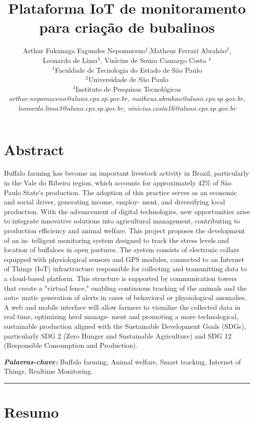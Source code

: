 \documentclass[11pt,a4paper]{article}
\title{\vspace{0.6cm}\textbf{\Large Plataforma IoT de monitoramento para criação de bubalinos}}
\author{
    Arthur Fukunaga Fagundes Nepomuceno$^{1}$,Matheus Ferrari Abrahão$^{2}$,\\Leonardo de Lima$^{3}$, Vinícius de Souza Camargo Costa $^{4}$ \\[0.3cm]
    \small
    $^{1}$Faculdade de Tecnologia do Estado de São Paulo \\
    $^{2}$Universidade de São Paulo \\
    $^{3}$Instituto de Pesquisas Tecnológicas \\[0.2cm]
    {\itshape arthur.nepomuceno@aluno.cps.sp.gov.br, matheus.abrahao@aluno.cps.sp.gov.br,}\\ {\itshape leonardo.lima3@aluno.cps.sp.gov.br, vinicius.costa16@aluno.cps.sp.gov.br}
}
\date{}
\begin{document}
\pagestyle{fancy}

\maketitle
\thispagestyle{fancy}

\section*{Abstract}

 Buffalo farming has become an important livestock activity in Brazil, particularly in the Vale do Ribeira region, which accounts for approximately 42\% of São Paulo State's production. The adoption of this practice serves as an economic and social driver, generating income, employ- ment, and diversifying local production. With the advancement of digital technologies, new opportunities arise to integrate innovative solutions into agricultural management, contributing to production efficiency and animal welfare. This project proposes the development of an in- telligent monitoring system designed to track the stress levels and location of buffaloes in open pastures. The system consists of electronic collars equipped with physiological sensors and GPS modules, connected to an Internet of Things (IoT) infrastructure responsible for collecting and transmitting data to a cloud-based platform. This structure is supported by communication towers that create a "virtual fence," enabling continuous tracking of the animals and the auto- matic generation of alerts in cases of behavioral or physiological anomalies. A web and mobile interface will allow farmers to visualize the collected data in real time, optimizing herd manage- ment and promoting a more technological, sustainable production aligned with the Sustainable Development Goals (SDGs), particularly SDG 2 (Zero Hunger and Sustainable Agriculture) and SDG 12 (Responsible Consumption and Production).

\vspace{0.3cm}
\noindent\textit{\textbf{Palavras-chave:}} Buffalo farming, Animal welfare, Smart tracking, Internet of Things, Realtime Monitoring.

\vspace{0.5cm}
\noindent\rule{\textwidth}{0.5pt}
\vspace{0.5cm}

\section*{Resumo}
\end{document}

